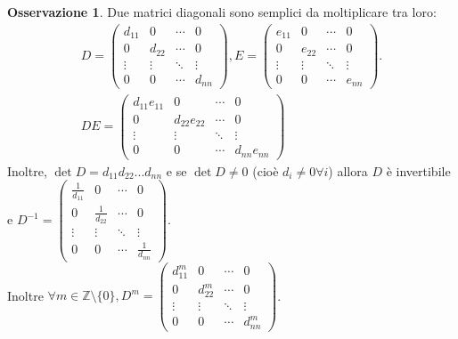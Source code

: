 \documentclass[a4paper]{article}
\theoremstyle{definition}
\newtheorem*{oss}{Osservazione}
\begin{document}
	\begin{oss}
		Due matrici diagonali sono semplici da moltiplicare tra loro:
		\begin{align*}
			D = \begin{pmatrix}
			d_{11} & 0 & \cdots & 0 \\
			0 & d_{22} & \cdots & 0 \\
			\vdots & \vdots & \ddots & \vdots \\
			0 & 0 & \cdots & d_{nn}
		\end{pmatrix}, E = \begin{pmatrix}
			e_{11} & 0 & \cdots & 0 \\
			0 & e_{22} & \cdots & 0 \\
			\vdots & \vdots & \ddots & \vdots \\
			0 & 0 & \cdots & e_{nn}
		\end{pmatrix}. \\
		DE = \begin{pmatrix}
			d_{11}e_{11} & 0 & \cdots & 0 \\
			0 & d_{22}e_{22} & \cdots & 0 \\
			\vdots & \vdots & \ddots & \vdots \\
			0 & 0 & \cdots & d_{nn}e_{nn}
		\end{pmatrix}
		\end{align*}
		Inoltre, $\det D = d_{11}d_{22}...d_{nn}$ e se $\det D \ne 0$ (cioè $d_i \ne 0 \forall i$) allora $D$ è invertibile e $D^{-1} = \begin{pmatrix}
			\frac{1}{d_{11}} & 0 & \cdots & 0 \\
			0 & \frac{1}{d_{22}} & \cdots & 0 \\
			\vdots & \vdots & \ddots & \vdots \\
			0 & 0 & \cdots & \frac{1}{d_{nn}}
		\end{pmatrix}$. \\
		Inoltre $\forall m \in \mathbb{Z} \setminus \{0\}, D^m = \begin{pmatrix}
			d_{11}^m & 0 & \cdots & 0 \\
			0 & d_{22}^m & \cdots & 0 \\
			\vdots & \vdots & \ddots & \vdots \\
			0 & 0 & \cdots & d_{nn}^m
		\end{pmatrix}$.
	\end{oss}
\end{document}
